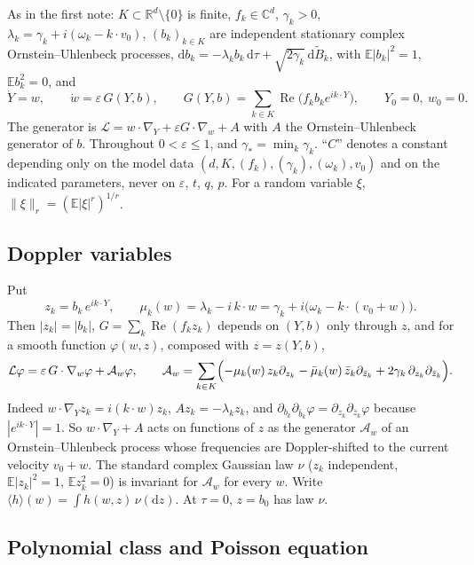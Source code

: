 \documentclass[11pt]{article}
\newcommand{\dd}{\mathrm{d}}
\newcommand{\E}{\mathbb{E}}
\newcommand{\eps}{\varepsilon}
\newcommand{\cL}{\mathcal{L}}
\newcommand{\cA}{\mathcal{A}}
\renewcommand{\Re}{\operatorname{Re}}
\newcommand{\nrm}[2]{\|#1\|_{#2}}
\newcommand{\avg}[1]{\langle #1\rangle}
\theoremstyle{remark}
\begin{document}
As in the first note: $K\subset\mathbb{R}^d\setminus\{0\}$ is finite,
$f_k\in\mathbb{C}^d$, $\gamma_k>0$, $\lambda_k = \gamma_k + i(\omega_k - k\cdot v_0)$,
$(b_k)_{k\in K}$ are independent stationary complex Ornstein--Uhlenbeck
processes, $\dd b_k = -\lambda_kb_k\,\dd\tau + \sqrt{2\gamma_k}\,\dd\tilde B_k$,
with $\E|b_k|^2 = 1$, $\E b_k^2 = 0$, and
\begin{equation}
  \dot Y = w,\qquad \dot w = \eps\,G(Y,b),\qquad
  G(Y,b) = \sum_{k\in K}\Re\bigl(f_kb_ke^{ik\cdot Y}\bigr),\qquad
  Y_0 = 0,\ w_0 = 0 .
  \label{eq:Yw}
\end{equation}
The generator is $\cL = w\cdot\nabla_Y + \eps G\cdot\nabla_w + A$ with $A$
the Ornstein--Uhlenbeck generator of $b$. Throughout $0<\eps\le1$, and
$\gamma_* = \min_k\gamma_k$. ``$C$'' denotes a constant depending only on the
model data $(d,K,(f_k),(\gamma_k),(\omega_k),v_0)$ and on the indicated
parameters, never on $\eps$, $t$, $q$, $p$. For a random variable $\xi$,
$\nrm{\xi}{r} = (\E|\xi|^r)^{1/r}$.

\subsection{Doppler variables}

Put
\[
  z_k = b_k\,e^{ik\cdot Y},\qquad
  \mu_k(w) = \lambda_k - i\,k\cdot w
  = \gamma_k + i\bigl(\omega_k - k\cdot(v_0+w)\bigr).
\]
Then $|z_k| = |b_k|$, $G = \sum_k\Re(f_kz_k)$ depends on $(Y,b)$ only through
$z$, and for a smooth function $\varphi(w,z)$, composed with $z = z(Y,b)$,
\begin{equation}
  \cL\varphi = \eps\,G\cdot\nabla_w\varphi + \cA_w\varphi,\qquad
  \cA_w = \sum_{k\in K}\Bigl(-\mu_k(w)\,z_k\partial_{z_k}
     - \bar\mu_k(w)\,\bar z_k\partial_{\bar z_k}
     + 2\gamma_k\,\partial_{z_k}\partial_{\bar z_k}\Bigr).
  \label{eq:Aw}
\end{equation}
Indeed $w\cdot\nabla_Yz_k = i(k\cdot w)z_k$, $Az_k = -\lambda_kz_k$, and
$\partial_{b_k}\partial_{\bar b_k}\varphi = \partial_{z_k}\partial_{\bar z_k}\varphi$
because $|e^{ik\cdot Y}| = 1$. So $w\cdot\nabla_Y + A$ acts on functions of
$z$ as the generator $\cA_w$ of an Ornstein--Uhlenbeck process whose
frequencies are Doppler-shifted to the current velocity $v_0+w$. The
standard complex Gaussian law $\nu$ ($z_k$ independent, $\E|z_k|^2=1$,
$\E z_k^2=0$) is invariant for $\cA_w$ for every $w$. Write
$\avg{h}(w) = \int h(w,z)\,\nu(\dd z)$. At $\tau=0$, $z = b_0$ has law $\nu$.

\subsection{Polynomial class and Poisson equation}
\end{document}
